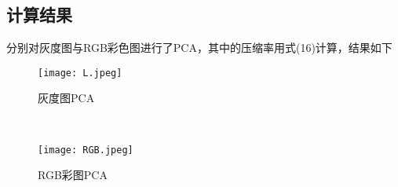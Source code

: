 \documentclass[UTF8,12pt]{ctexart}
\begin{document}
\subsection*{计算结果}
分别对灰度图与RGB彩色图进行了PCA，其中的压缩率用式(16)计算，结果如下
\\
\begin{figure}
	\centering
	\texttt{[image: L.jpeg]}
	\caption{灰度图PCA}
\end{figure}
\\
\begin{figure}
	\centering
	\texttt{[image: RGB.jpeg]}
	\caption{RGB彩图PCA}
\end{figure}
\end{document}
